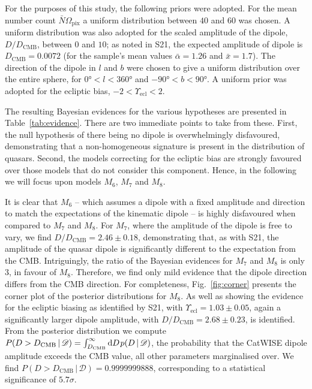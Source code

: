 \documentclass[fleqn,usenatbib]{mnras}
\def\ssp{\hspace{0.09em}}
\def\mrm#1{\mathrm{#1}}
\def\mid{\,|\,}
\def\dif{\mathrm{d}}
\begin{document}
For the purposes of this study, the following priors were adopted.
For the mean number count $\bar{N}\Omega_\mrm{pix}$ a uniform distribution between $40$ and $60$ was chosen. A uniform distribution was also adopted for the scaled amplitude of the dipole, $D / D_\text{CMB}$, between $0$ and $10$;
%
as noted in S21, the expected amplitude of dipole is $D_\text{CMB} = 0.0072$ (for the sample's mean values
$\bar\alpha=1.26$ and $\bar{x}=1.7$).
%
The direction of the dipole in $l$ and $b$ were chosen to give a uniform distribution over the entire sphere, for $\ang{0} < l < \ang{360}$ and $\ang{-90} < b < \ang{90}$. A uniform prior was adopted for the
ecliptic bias, $-2 < \Upsilon_\mrm{ecl} < 2 $.

The resulting Bayesian evidences for the various hypotheses are presented in Table~\ref{tab:evidence}. There are two immediate points to take from these. First, the null hypothesis of there being no dipole is overwhelmingly disfavoured, demonstrating that a non-homogeneous signature is present in the distribution of quasars. Second, the models correcting for the ecliptic bias are strongly favoured over those models that do not consider this component. Hence, in the following we will focus upon models $M_6$, $M_7$ and $M_8$.

It is clear that $M_6$ -- which assumes a dipole with a fixed amplitude and direction to match the expectations of the kinematic dipole -- is highly disfavoured when compared to $M_7$ and $M_8$.
%
For $M_7$, where the amplitude of the dipole is free to vary, we find $D / D_\text{CMB} = 2.46 \pm 0.18$, 
demonstrating that, as with S21, the amplitude of the quasar dipole is significantly different 
to the expectation from the CMB.
%
Intriguingly, the ratio of the Bayesian evidences for $M_7$ and $M_8$ is only 3, in favour of $M_8$. Therefore, we find only mild evidence that the dipole direction differs from the CMB direction. 
%
For completeness, Fig.~\ref{fig:corner} presents the corner plot of the posterior distributions for $M_8$. 
As well as showing the evidence for the ecliptic biasing as identified by S21, with $\Upsilon_\mrm{ecl} = 1.03 \pm 0.05$, again a significantly larger dipole amplitude, with $D / D_\text{CMB} = 2.68 \pm 0.23$, is identified. From the posterior distribution we compute $P(D>D_\text{CMB}\mid\mathscr{D})=\int^\infty_{D_\text{CMB}}\dif D\ssp p(D\mid\mathscr{D})$, 
the probability that the CatWISE dipole amplitude exceeds the CMB value, all other parameters
marginalised over. We find $P(D>D_\text{CMB}\mid\mathscr{D})=0.9999999888$,
corresponding to a statistical significance of $5.7\sigma$.
\end{document}
